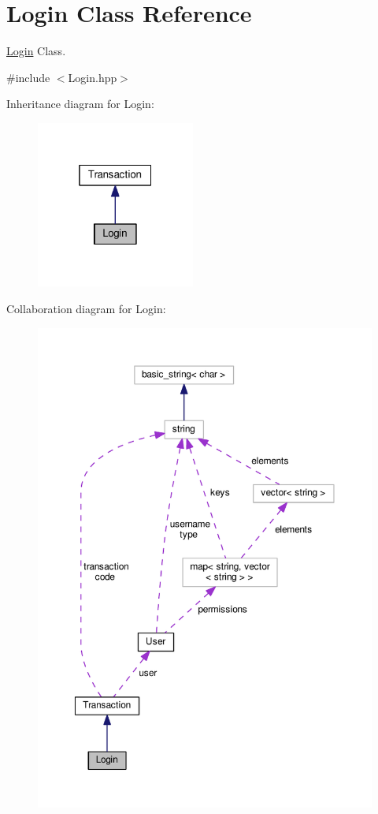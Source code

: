 \hypertarget{class_login}{\section{Login Class Reference}
\label{class_login}
}


\hyperlink{class_login}{Login} Class.  




{\ttfamily \#include $<$Login.\-hpp$>$}



Inheritance diagram for Login\-:\nopagebreak
\begin{figure}[H]
\begin{center}
\leavevmode
\includegraphics[width=148pt]{class_login__inherit__graph}
\end{center}
\end{figure}


Collaboration diagram for Login\-:\nopagebreak
\begin{figure}[H]
\begin{center}
\leavevmode
\includegraphics[width=350pt]{class_login__coll__graph}
\end{center}
\end{figure}
